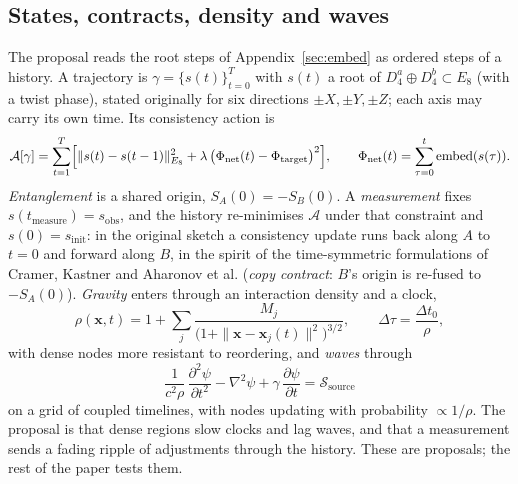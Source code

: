 \documentclass[11pt]{article}
\theoremstyle{definition}
\begin{document}
\subsection{States, contracts, density and waves}\label{sec:formal}
\label{sec:axes}\label{sec:retro}
The proposal reads the root steps of Appendix~\ref{sec:embed} as ordered steps of a history. A trajectory is $\gamma=\{s(t)\}_{t=0}^{T}$ with $s(t)$ a root of $D_4^a\oplus D_4^b\subset E_8$ (with a twist phase), stated originally for six directions $\pm X,\pm Y,\pm Z$; each axis may carry its own time. Its consistency action is
\begin{equation}\label{eq:action}
\mathcal{A}[\gamma]=\sum_{t=1}^{T}\Bigl[\|s(t)-s(t-1)\|^2_{E_8}+\lambda\,\bigl(\Phi_{\mathrm{net}}(t)-\Phi_{\mathrm{target}}\bigr)^2\Bigr],\qquad \Phi_{\mathrm{net}}(t)=\sum_{\tau=0}^{t}\mathrm{embed}(s(\tau)).
\end{equation}
\emph{Entanglement} is a shared origin, $S_A(0)=-S_B(0)$. A \emph{measurement} fixes $s(t_{\mathrm{measure}})=s_{\mathrm{obs}}$, and the history re-minimises $\mathcal{A}$ under that constraint and $s(0)=s_{\mathrm{init}}$: in the original sketch a consistency update runs back along $A$ to $t=0$ and forward along $B$, in the spirit of the time-symmetric formulations of Cramer, Kastner and Aharonov et al. (\emph{copy contract}: $B$'s origin is re-fused to $-S_A(0)$). \emph{Gravity} enters through an interaction density and a clock,
\begin{equation}\label{eq:density}
\rho(\mathbf{x},t)=1+\sum_j\frac{M_j}{\bigl(1+\|\mathbf{x}-\mathbf{x}_j(t)\|^2\bigr)^{3/2}},\qquad \Delta\tau=\frac{\Delta t_0}{\rho},
\end{equation}
with dense nodes more resistant to reordering, and \emph{waves} through
\begin{equation}\label{eq:wave}
\frac{1}{c^2\rho}\,\frac{\partial^2\psi}{\partial t^2}-\nabla^2\psi+\gamma\,\frac{\partial\psi}{\partial t}=\mathcal{S}_{\mathrm{source}}
\end{equation}
on a grid of coupled timelines, with nodes updating with probability $\propto1/\rho$. The proposal is that dense regions slow clocks and lag waves, and that a measurement sends a fading ripple of adjustments through the history. These are proposals; the rest of the paper tests them.
\end{document}
